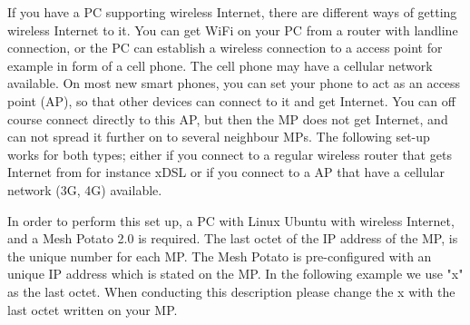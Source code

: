 If you have a PC supporting wireless Internet, there are different ways of getting wireless Internet to it. You can get WiFi on your PC from a router with landline connection, or the PC can establish a wireless connection to a access point for example in form of a cell phone. The cell phone may have a cellular network available. On most new smart phones, you can set your phone to act as an access point (AP), so that other devices can connect to it and get Internet. You can off course connect directly to this AP, but then the MP does not get Internet, and can not spread it further on to several neighbour MPs. The following set-up works for both types; either if you connect to a regular wireless router that gets Internet from for instance xDSL or if you connect to a AP that have a cellular network (3G, 4G) available. 

In order to perform this set up, a PC with Linux Ubuntu with wireless Internet, and a Mesh Potato 2.0 is required. The last octet of the IP address of the MP, is the unique number for each MP. The Mesh Potato is pre-configured with an unique IP address which is stated on the MP. In the following example we use "x" as the last octet. When conducting this description please change the x with the last octet written on your MP.


